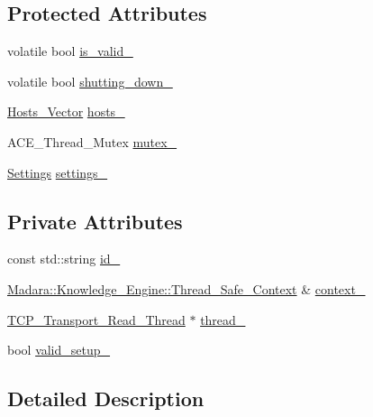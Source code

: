 \subsection*{Protected Attributes}
\begin{DoxyCompactItemize}
\item 
volatile bool \hyperlink{classMadara_1_1Transport_1_1Base_a77696ae1c39c0d0edc169882c4b82c23}{is\_\-valid\_\-}
\item 
volatile bool \hyperlink{classMadara_1_1Transport_1_1Base_a6c3d03895e92c93265704052ab707f8a}{shutting\_\-down\_\-}
\item 
\hyperlink{classMadara_1_1Transport_1_1Base_a2957ae0c413e07b7e276ae69ef1c320a}{Hosts\_\-Vector} \hyperlink{classMadara_1_1Transport_1_1Base_a19ac6cbfb41691ad4300a5e696e3b04e}{hosts\_\-}
\item 
ACE\_\-Thread\_\-Mutex \hyperlink{classMadara_1_1Transport_1_1Base_a81479f3b01798d0836dc44629c904450}{mutex\_\-}
\item 
\hyperlink{classMadara_1_1Transport_1_1Settings}{Settings} \hyperlink{classMadara_1_1Transport_1_1Base_adafa1a5641aaecae76d963748bddf8e2}{settings\_\-}
\end{DoxyCompactItemize}
\subsection*{Private Attributes}
\begin{DoxyCompactItemize}
\item 
const std::string \hyperlink{classMadara_1_1Transport_1_1TCP__Transport_a47c2228f55dda91ba2d554d4034cbe89}{id\_\-}
\item 
\hyperlink{classMadara_1_1Knowledge__Engine_1_1Thread__Safe__Context}{Madara::Knowledge\_\-Engine::Thread\_\-Safe\_\-Context} \& \hyperlink{classMadara_1_1Transport_1_1TCP__Transport_aeb128a209fbfffd97d572230d2faab99}{context\_\-}
\item 
\hyperlink{classMadara_1_1Transport_1_1TCP__Transport__Read__Thread}{TCP\_\-Transport\_\-Read\_\-Thread} $\ast$ \hyperlink{classMadara_1_1Transport_1_1TCP__Transport_a3786a18bcea7954c074bfc74541944bd}{thread\_\-}
\item 
bool \hyperlink{classMadara_1_1Transport_1_1TCP__Transport_a2d4ff7935612176cf98a4feaa9d15510}{valid\_\-setup\_\-}
\end{DoxyCompactItemize}


\subsection{Detailed Description}



